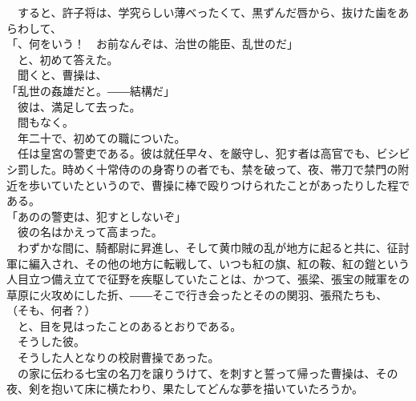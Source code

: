 \documentclass[
  paper=a5,
  fontsize=10pt,
  jafontsize=9.5pt,
  tate,                  %
  open_bracket_pos=nibu, %
]{jlreq}
\begin{document}
　すると、許子将は、学究らしい薄べったくて、黒ずんだ唇から、抜けた歯をあらわして、\\


「、何をいう！　お前なんぞは、治世の能臣、乱世のだ」\\


　と、初めて答えた。\\


　聞くと、曹操は、\\


「乱世の姦雄だと。――結構だ」\\


　彼は、満足して去った。\\


　間もなく。\\


　年二十で、初めての職についた。\\


　任は皇宮の警吏である。彼は就任早々、を厳守し、犯す者は高官でも、ビシビシ罰した。時めく十常侍のの身寄りの者でも、禁を破って、夜、帯刀で禁門の附近を歩いていたというので、曹操に棒で殴りつけられたことがあったりした程である。\\


「あのの警吏は、犯すとしないぞ」\\


　彼の名はかえって高まった。\\


　わずかな間に、騎都尉に昇進し、そして黄巾賊の乱が地方に起ると共に、征討軍に編入され、その他の地方に転戦して、いつも紅の旗、紅の鞍、紅の鎧という人目立つ備え立てで征野を疾駆していたことは、かつて、張梁、張宝の賊軍をの草原に火攻めにした折、――そこで行き会ったとそのの関羽、張飛たちも、\\


（そも、何者？）\\


　と、目を見はったことのあるとおりである。\\


　そうした彼。\\


　そうした人となりの校尉曹操であった。\\


　の家に伝わる七宝の名刀を譲りうけて、を刺すと誓って帰った曹操は、その夜、剣を抱いて床に横たわり、果たしてどんな夢を描いていたろうか。\\
\end{document}
